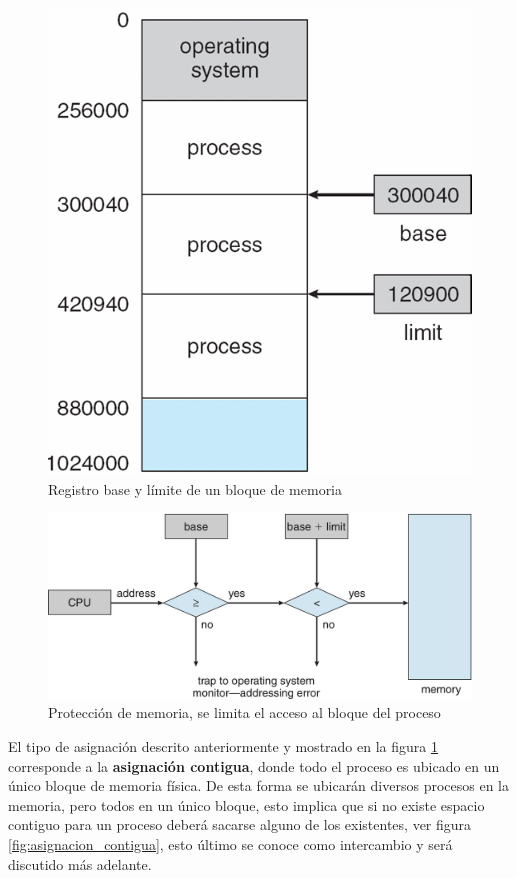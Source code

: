 \begin{figure}[htbp]
\centering
\includegraphics[scale=0.5]{img/C07_memoria/base_limite.png}
\caption{Registro base y límite de un bloque de memoria}
\label{fig:baselimite}
\end{figure}

\begin{figure}[htbp]
\centering
\includegraphics[scale=1]{img/C07_memoria/segmentation_fault.png}
\caption{Protección de memoria, se limita el acceso al bloque del proceso}
\label{fig:segmentation_fault}
\end{figure}

El tipo de asignación descrito anteriormente y mostrado en la figura
\ref{fig:baselimite} corresponde a la \textbf{asignación contigua}, donde todo
el proceso es ubicado en un único bloque de memoria física. De esta forma se
ubicarán diversos procesos en la memoria, pero todos en un único bloque, esto
implica que si no existe espacio contiguo para un proceso deberá sacarse alguno
de los existentes, ver figura \ref{fig:asignacion_contigua}, esto último se
conoce como intercambio y será discutido más adelante.

